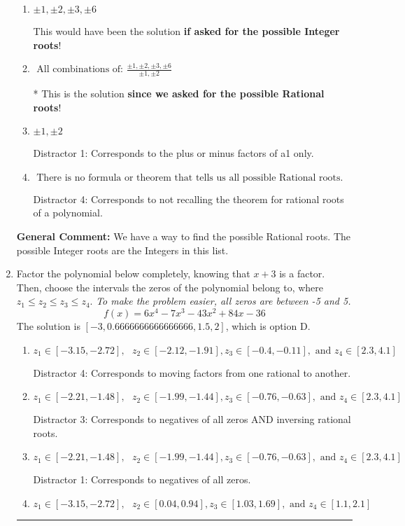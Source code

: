 \documentclass{extbook}[14pt]
\newcommand{\litem}[1]{\item #1

\rule{\textwidth}{0.4pt}}
\begin{document}
\begin{enumerate}
{\begin{enumerate}[label=\Alph*.]
 Distractor 3: Corresponds to the plus or minus of the inverse quotient (an/a0) of the factors. 
\item \( \pm 1,\pm 2,\pm 3,\pm 6 \)

This would have been the solution \textbf{if asked for the possible Integer roots}!
\item \( \text{ All combinations of: }\frac{\pm 1,\pm 2,\pm 3,\pm 6}{\pm 1,\pm 2} \)

* This is the solution \textbf{since we asked for the possible Rational roots}!
\item \( \pm 1,\pm 2 \)

 Distractor 1: Corresponds to the plus or minus factors of a1 only.
\item \( \text{ There is no formula or theorem that tells us all possible Rational roots.} \)

 Distractor 4: Corresponds to not recalling the theorem for rational roots of a polynomial.
\end{enumerate}

\textbf{General Comment:} We have a way to find the possible Rational roots. The possible Integer roots are the Integers in this list.
}
\litem{
Factor the polynomial below completely, knowing that $x+3$ is a factor. Then, choose the intervals the zeros of the polynomial belong to, where $z_1 \leq z_2 \leq z_3 \leq z_4$. \textit{To make the problem easier, all zeros are between -5 and 5.}
\[ f(x) = 6x^{4} -7 x^{3} -43 x^{2} +84 x -36 \]The solution is \( [-3, 0.6666666666666666, 1.5, 2] \), which is option D.\begin{enumerate}[label=\Alph*.]
\item \( z_1 \in [-3.15, -2.72], \text{   }  z_2 \in [-2.12, -1.91], z_3 \in [-0.4, -0.11], \text{   and   } z_4 \in [2.3, 4.1] \)

 Distractor 4: Corresponds to moving factors from one rational to another.
\item \( z_1 \in [-2.21, -1.48], \text{   }  z_2 \in [-1.99, -1.44], z_3 \in [-0.76, -0.63], \text{   and   } z_4 \in [2.3, 4.1] \)

 Distractor 3: Corresponds to negatives of all zeros AND inversing rational roots.
\item \( z_1 \in [-2.21, -1.48], \text{   }  z_2 \in [-1.99, -1.44], z_3 \in [-0.76, -0.63], \text{   and   } z_4 \in [2.3, 4.1] \)

 Distractor 1: Corresponds to negatives of all zeros.
\item \( z_1 \in [-3.15, -2.72], \text{   }  z_2 \in [0.04, 0.94], z_3 \in [1.03, 1.69], \text{   and   } z_4 \in [1.1, 2.1] \)


\end{enumerate}}
\end{enumerate}
\end{document}
